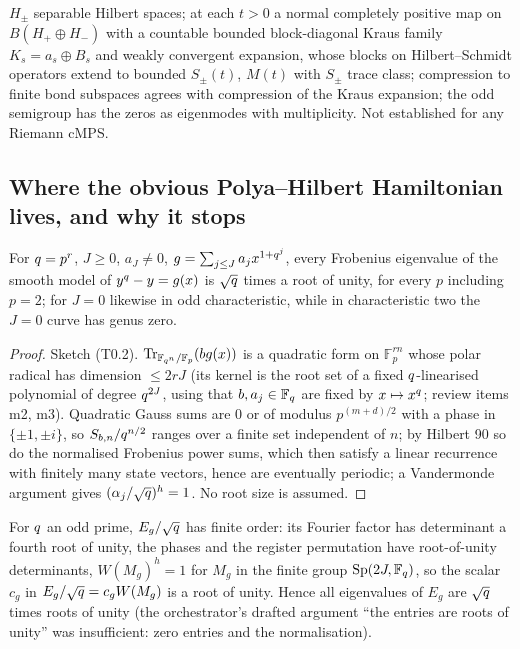 \begin{assumption}
\label{asm:kraus-hs-setting}
$H_\pm$ separable Hilbert spaces; at each $t>0$ a normal completely positive map on
$B(H_+\oplus H_-)$ with a countable bounded block-diagonal Kraus family $K_s = a_s\oplus B_s$
and weakly convergent expansion, whose blocks on Hilbert--Schmidt operators extend to bounded
$S_\pm(t)$, $M(t)$ with $S_\pm$ trace class; compression to finite bond subspaces agrees with
compression of the Kraus expansion; the odd semigroup has the zeros as eigenmodes with
multiplicity. Not established for any Riemann cMPS.
\end{assumption}

\subsection{Where the obvious Polya--Hilbert Hamiltonian lives, and why it stops}

\begin{theorem}
\label{thm:as-quadratic-supersingular}
For $q = p^r$, $J\ge0$, $a_J\ne0$, $g = \sum_{j\le J}a_jx^{1+q^j}$, every Frobenius
eigenvalue of the smooth model of $y^{q}-y = g(x)$ is $\sqrt{q}$ times a root of unity, for
every $p$ including $p = 2$; for $J = 0$ likewise in odd characteristic, while in
characteristic two the $J = 0$ curve has genus zero.
\end{theorem}

\begin{proof}
Sketch (T0.2). $\operatorname{Tr}_{\mathbb F_{q^{n}}/\mathbb F_p}(bg(x))$ is a quadratic form on $\mathbb F_p^{rn}$ whose
polar radical has dimension $\le2rJ$ (its kernel is the root set of a fixed $q$-linearised
polynomial of degree $q^{2J}$, using that $b,a_j\in\mathbb F_q$ are fixed by $x\mapsto x^{q}$; review items m2, m3). Quadratic Gauss sums are $0$ or of modulus $p^{(m+d)/2}$ with a
phase in $\{\pm1,\pm i\}$, so $S_{b,n}/q^{n/2}$ ranges over a finite set independent of $n$;
by Hilbert 90 so do the normalised Frobenius power sums, which then satisfy a linear recurrence
with finitely many state vectors, hence are eventually periodic; a Vandermonde argument gives
$(\alpha_{j}/\sqrt{q})^h = 1$. No root size is assumed.
\end{proof}

\begin{proposition}
\label{prop:as-finite-order}
For $q$ an odd prime, $E_g/\sqrt{q}$ has finite order: its Fourier factor has determinant a
fourth root of unity, the phases and the register permutation have root-of-unity determinants,
$W(M_g)^h = 1$ for $M_g$ in the finite group $\operatorname{Sp}(2J,\mathbb F_q)$, so the scalar $c_g$ in
$E_g/\sqrt{q} = c_gW(M_g)$ is a root of unity. Hence all eigenvalues of $E_g$ are
$\sqrt{q}$ times roots of unity (the orchestrator's drafted argument ``the entries are roots
of unity'' was insufficient: zero entries and the normalisation).
\end{proposition}

